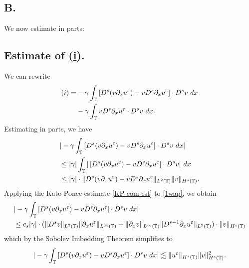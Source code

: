 	\subsection{ B.} We now estimate in parts:
\subsection{ Estimate of (\hyperref[8u]{i}).} 
We can rewrite
	\begin{equation}
		\begin{split}
			(i)
			= & -\gamma \int_{\mathbb{T}} \left[ D^s(v \partial_x u^\varepsilon) - v D^s
			\partial_x u^\varepsilon \right] \cdot D^s v \ dx
			\\
			& -  \gamma \int_{\mathbb{T}} v D^s \partial_x u^\varepsilon \cdot D^s v \ dx.
			\label{1wap'}
		\end{split}
	\end{equation}
	Estimating in parts, we have
	\begin{equation}
		\begin{split}
			& |-\gamma \int_{\mathbb{T}} \left[ D^s(v \partial_x u^\varepsilon) - v D^s
			\partial_x u^\varepsilon \right] \cdot D^s v \ dx |
			\\
			& \le |\gamma| \int_{\mathbb{T}} |\left[ D^s(v \partial_x u^\varepsilon ) - v D^s
			\partial_x u^\varepsilon \right] \cdot D^s v| \ dx
			\\
			& \le |\gamma| \cdot \|D^s (v \partial_x u^\varepsilon) - v D^s \partial_x u^\varepsilon
			\|_{L^2(\mathbb{T})} \|v\|_{H^s(\mathbb{T})}.
			\label{1wap}
		\end{split}
	\end{equation}
	Applying the Kato-Ponce estimate \eqref{KP-com-est} to \eqref{1wap}, we
	obtain
	\begin{equation*}
		\begin{split}
			& | -\gamma \int_{\mathbb{T}} \left[ D^s(v \partial_x u^\varepsilon) - v D^s
			\partial_x u^\varepsilon \right] \cdot D^s v \ dx |
			\\
			& \le c_s |\gamma| \cdot ( \|D^s v \|_{L^2(\mathbb{T})} \|\partial_x
			u^\varepsilon\|_{L^\infty(\mathbb{T})} + \|\partial_x v \|_{L^\infty(\mathbb{T})} \|D^{s-1}
			\partial_x u^\varepsilon \|_{L^2(\mathbb{T})}) \cdot \|v\|_{H^s(\mathbb{T})}
		\end{split}
	\end{equation*}
	which by the Sobolev Imbedding Theorem simplifies to
	\begin{equation}
		\begin{split}
			| -\gamma \int_{\mathbb{T}} \left[ D^s(v \partial_x u^\varepsilon ) - v D^s
			\partial_x u^\varepsilon \right] \cdot D^s v \ dx |
			\lesssim \|u^\varepsilon \|_{H^s(\mathbb{T})} \|v\|_{H^s(\mathbb{T})}^2.
			\label{2wap}
		\end{split}
	\end{equation}

